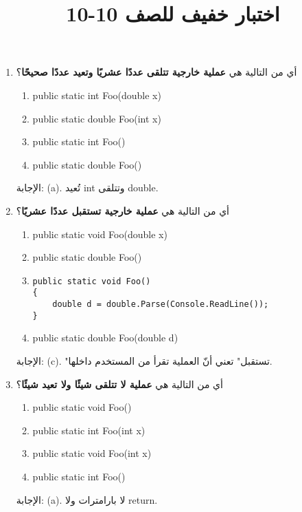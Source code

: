 \documentclass[14pt]{extarticle}
\title{اختبار خفيف للصف 10-10}
\begin{document}
\maketitle

\begin{enumerate}[itemsep=1.8em]

\item
أي من التالية هي \textbf{عملية خارجية تتلقى عددًا عشريًا وتعيد عددًا صحيحًا}؟
\begin{english}
\begin{enumerate}[label=(\alph*)]
    \item public static int Foo(double x)
    \item public static double Foo(int x)
    \item public static int Foo()
    \item public static double Foo()
\end{enumerate}
\end{english}
\ifwithsols
\begin{boxSolution}
الإجابة: (a).
تُعيد \textenglish{int} وتتلقى \textenglish{double}.
\end{boxSolution}
\fi


\item
أي من التالية هي \textbf{عملية خارجية تستقبل عددًا عشريًا}؟
\begin{english}
\begin{enumerate}[label=(\alph*)]
    \item public static void Foo(double x)
    \item public static double Foo()
    \item \begin{verbatim}
public static void Foo()
{
    double d = double.Parse(Console.ReadLine());
}
\end{verbatim}
    \item public static double Foo(double d)
\end{enumerate}
\end{english}
\ifwithsols
\begin{boxSolution}
الإجابة: (c).
"تستقبل" تعني أنّ العملية تقرأ من المستخدم داخلها.
\end{boxSolution}
\fi


\item
أي من التالية هي \textbf{عملية لا تتلقى شيئًا ولا تعيد شيئًا}؟
\begin{english}
\begin{enumerate}[label=(\alph*)]
    \item public static void Foo()
    \item public static int Foo(int x)
    \item public static void Foo(int x)
    \item public static int Foo()
\end{enumerate}
\end{english}
\ifwithsols
\begin{boxSolution}
الإجابة: (a).
لا بارامترات ولا return.
\end{boxSolution}
\fi


\end{enumerate}
\end{document}
